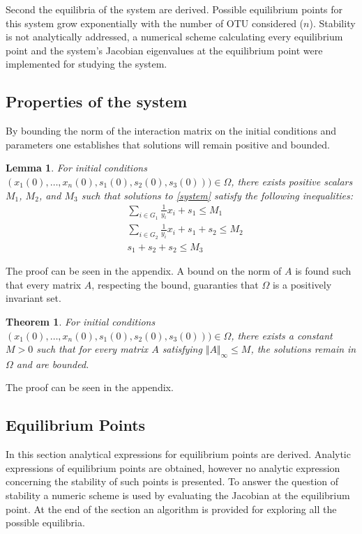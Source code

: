 \documentclass[3p,times]{elsarticle}
\newtheorem{lemma}{Lemma}
\newtheorem{theo}{Theorem}
\begin{document}
Second the equilibria of the system are derived. Possible equilibrium points for this system grow exponentially with the number of OTU considered ($n$).  Stability is not analytically addressed, a numerical scheme calculating every equilibrium point and the system's Jacobian eigenvalues at the equilibrium point were implemented for studying the system. 


\subsection{Properties of the system}

 By bounding the norm of the interaction matrix on the initial conditions and parameters one establishes that solutions will remain positive and bounded. 

\begin{lemma}
	\label{l1}
	For initial conditions $(x_1(0),\dots,x_n(0),s_1(0),s_2(0),s_3(0)))\in \Omega$, there exists positive scalars $M_1$, $M_2$, and $M_3$ such that solutions to \eqref{system} satisfy the following inequalities:
	\begin{align}
	&\sum \limits_{i \in G_1} \frac{1}{y_i}x_i + s_1 \leq M_1 \\
	&\sum \limits_{i \in G_2} \frac{1}{y_i}x_i + s_1 +s_2 \leq M_2 \\
	&s_1 + s_2 + s_2 \leq M_3
	\end{align}
\end{lemma}

The proof can be seen in the appendix. A bound on the norm of $A$ is found such that every matrix $A$, respecting the bound, guaranties that $\Omega$ is a positively invariant set.

\begin{theo}
	\label{theoWellPosedness}
	For initial conditions $(x_1(0),\dots,x_n(0),s_1(0),s_2(0),s_3(0)))\in \Omega$, there exists a constant $M>0$ such that for every matrix $A$ satisfying $\Vert A \Vert_{\infty} \leq M $, the solutions remain in $\Omega$ and are bounded.
\end{theo}

The proof can be seen in the appendix.

\subsection{Equilibrium Points}

In this section analytical expressions for equilibrium points are derived. Analytic expressions of equilibrium points are obtained, however no analytic expression concerning the stability of such points is presented. To answer the question of stability a numeric scheme is used by evaluating the Jacobian at the equilibrium point. At the end of the section an algorithm is provided for exploring all the possible equilibria.
\end{document}
